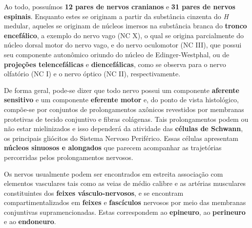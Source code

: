 \documentclass[
]{book}
\begin{document}
Ao todo, possuímos \textbf{12 pares de nervos cranianos} e \textbf{31 pares de nervos espinais}. Enquanto estes se originam a partir da substância cinzenta do \emph{H} medular, aqueles se originam de núcleos imersos na substância branca do \textbf{tronco encefálico}, a exemplo do nervo vago (NC X), o qual se origina parcialmente do núcleo dorsal motor do nervo vago, e do nervo oculomotor (NC III), que possui seu componente autonômico oriundo do núcleo de Edinger-Westphal, ou de \textbf{projeções telencefálicas} e \textbf{diencefálicas}, como se observa para o nervo olfatório (NC I) e o nervo óptico (NC II), respectivamente.

De forma geral, pode-se dizer que todo nervo possui um componente \textbf{aferente sensitivo} e um componente \textbf{eferente motor} e, do ponto de vista histológico, compõe-se por conjuntos de prolongamentos axônicos revestidos por membranas protetivas de tecido conjuntivo e fibras colágenas. Tais prolongamentos podem ou não estar mielinizados e isso dependerá da atividade das \textbf{células de Schwann}, os principais gliócitos do Sistema Nervoso Periférico. Essas células apresentam \textbf{núcleos sinuosos e alongados} que parecem acompanhar as trajetórias percorridas pelos prolongamentos nervosos.

Os nervos usualmente podem ser encontrados em estreita associação com elementos vasculares tais como as veias de médio calibre e as artérias musculares constituintes dos \textbf{feixes vásculo-nervosos}, e se encontram compartimentalizados em \textbf{feixes} e \textbf{fascículos} nervosos por meio das membranas conjuntivas supramencionadas. Estas correspondem ao \textbf{epineuro}, ao \textbf{perineuro} e ao \textbf{endoneuro}.
\end{document}
